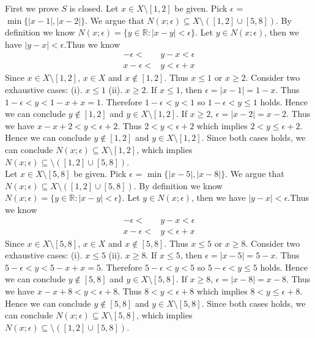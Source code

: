 \documentclass{article}
\begin{document}
	First we prove $S$ is closed. Let $x \in X \setminus [1,2]$ be given. Pick $\epsilon$ = $\min \{|x-1|,|x-2|\}$. We argue that $N(x;\epsilon) \subseteq X \setminus ([1,2] \cup [5,8])$. By definition we know $N(x;\epsilon) = \{y \in \mathbb{R}:|x-y|<\epsilon\}$. Let $y \in N(x;\epsilon)$, then we have $|y-x|<\epsilon$.Thus we know
	\begin{align*}
		-\epsilon<&y-x<\epsilon\\
		x-\epsilon<&y<\epsilon+x
	\end{align*}
	Since $x \in X \setminus [1,2]$, $x \in X$ and $x \notin [1,2]$. Thus $x \leq 1$ or $x \geq 2$. Consider two exhaustive cases: (i). $x \leq 1$ (ii). $x \geq 2$. If $x \leq 1$, then $\epsilon = |x-1| = 1-x$. Thus $1-\epsilon<y<1-x+x=1$. Therefore $1-\epsilon<y<1$ so $1-\epsilon<y \leq 1$ holds. Hence we can conclude $y \notin [1,2]$ and $y \in X \setminus [1,2]$. If $x \geq 2$, $\epsilon = |x-2| = x-2$. Thus we have $x-x+2<y<\epsilon+2$. Thus $2<y<\epsilon+2$ which implies $2<y \leq \epsilon+2$. Hence we can conclude $y \notin [1,2]$ and $y \in X \setminus [1,2]$. Since both cases holds, we can conclude $N(x;\epsilon) \subseteq X \setminus [1,2]$, which implies $N(x;\epsilon) \subseteq \setminus ([1,2] \cup [5,8])$.\\
	
	Let $x \in X \setminus [5,8]$ be given. Pick $\epsilon$ = $\min \{|x-5|,|x-8|\}$. We argue that $N(x;\epsilon) \subseteq X \setminus ([1,2] \cup [5,8])$. By definition we know $N(x;\epsilon) = \{y \in \mathbb{R}:|x-y|<\epsilon\}$. Let $y \in N(x;\epsilon)$, then we have $|y-x|<\epsilon$.Thus we know
	\begin{align*}
		-\epsilon<&y-x<\epsilon\\
		x-\epsilon<&y<\epsilon+x
	\end{align*}
	Since $x \in X \setminus [5,8]$, $x \in X$ and $x \notin[5,8]$. Thus $x \leq 5$ or $x \geq 8$. Consider two exhaustive cases: (i). $x \leq 5$ (ii). $x \geq 8$. If $x \leq 5$, then $\epsilon = |x-5| = 5-x$. Thus $5-\epsilon<y<5-x+x=5$. Therefore $5-\epsilon<y<5$ so $5-\epsilon<y \leq 5$ holds. Hence we can conclude $y \notin [5,8]$ and $y \in X \setminus [5,8]$. If $x \geq 8$, $\epsilon = |x-8| = x-8$. Thus we have $x-x+8<y<\epsilon+8$. Thus $8<y<\epsilon+8$ which implies $8<y \leq \epsilon+8$. Hence we can conclude $y \notin [5,8]$ and $y \in X \setminus [5,8]$. Since both cases holds, we can conclude $N(x;\epsilon) \subseteq X \setminus [5,8]$, which implies $N(x;\epsilon) \subseteq \setminus ([1,2] \cup [5,8])$.\\
	
\end{document}
